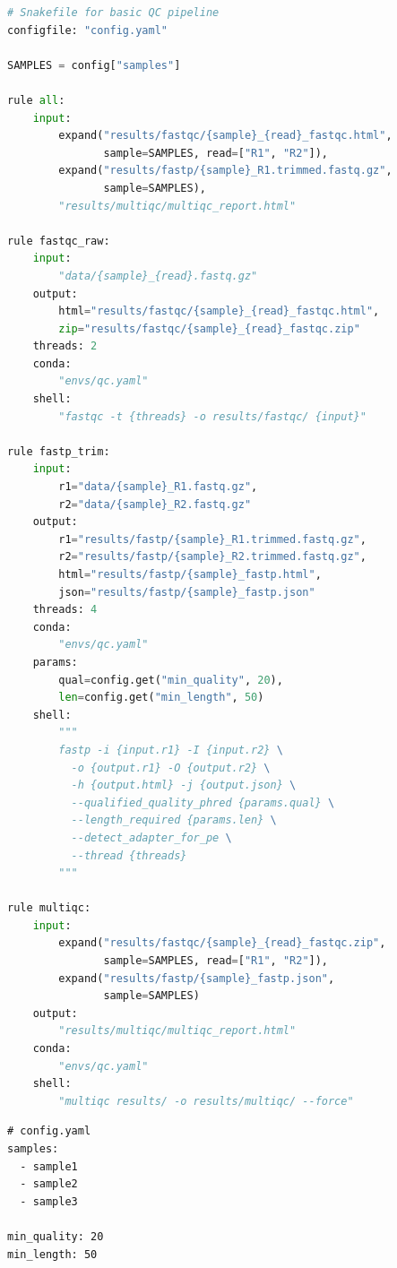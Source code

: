 \begin{lstlisting}[language=Python,caption={Complete Snakemake workflow for a basic FASTQ QC pipeline.},label=lst:snakemake-qc]
# Snakefile for basic QC pipeline
configfile: "config.yaml"

SAMPLES = config["samples"]

rule all:
    input:
        expand("results/fastqc/{sample}_{read}_fastqc.html",
               sample=SAMPLES, read=["R1", "R2"]),
        expand("results/fastp/{sample}_R1.trimmed.fastq.gz",
               sample=SAMPLES),
        "results/multiqc/multiqc_report.html"

rule fastqc_raw:
    input:
        "data/{sample}_{read}.fastq.gz"
    output:
        html="results/fastqc/{sample}_{read}_fastqc.html",
        zip="results/fastqc/{sample}_{read}_fastqc.zip"
    threads: 2
    conda:
        "envs/qc.yaml"
    shell:
        "fastqc -t {threads} -o results/fastqc/ {input}"

rule fastp_trim:
    input:
        r1="data/{sample}_R1.fastq.gz",
        r2="data/{sample}_R2.fastq.gz"
    output:
        r1="results/fastp/{sample}_R1.trimmed.fastq.gz",
        r2="results/fastp/{sample}_R2.trimmed.fastq.gz",
        html="results/fastp/{sample}_fastp.html",
        json="results/fastp/{sample}_fastp.json"
    threads: 4
    conda:
        "envs/qc.yaml"
    params:
        qual=config.get("min_quality", 20),
        len=config.get("min_length", 50)
    shell:
        """
        fastp -i {input.r1} -I {input.r2} \
          -o {output.r1} -O {output.r2} \
          -h {output.html} -j {output.json} \
          --qualified_quality_phred {params.qual} \
          --length_required {params.len} \
          --detect_adapter_for_pe \
          --thread {threads}
        """

rule multiqc:
    input:
        expand("results/fastqc/{sample}_{read}_fastqc.zip",
               sample=SAMPLES, read=["R1", "R2"]),
        expand("results/fastp/{sample}_fastp.json",
               sample=SAMPLES)
    output:
        "results/multiqc/multiqc_report.html"
    conda:
        "envs/qc.yaml"
    shell:
        "multiqc results/ -o results/multiqc/ --force"
\end{lstlisting}

\begin{lstlisting}[caption={config.yaml for the Snakemake QC pipeline.},label=lst:snakemake-config]
# config.yaml
samples:
  - sample1
  - sample2
  - sample3

min_quality: 20
min_length: 50
\end{lstlisting}

